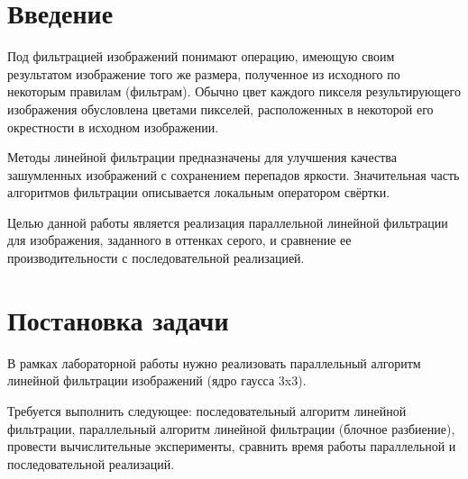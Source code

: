 \documentclass{report}
\begin{document}
\setcounter{page}{2}

\newpage

\section*{Введение}
Под фильтрацией изображений понимают операцию, имеющую своим результатом изображение того же размера, полученное из исходного по некоторым правилам (фильтрам). Обычно цвет каждого пикселя результирующего изображения обусловлена цветами пикселей, расположенных в некоторой его окрестности в исходном изображении.
\par
Методы линейной фильтрации предназначены для улучшения качества зашумленных изображений с сохранением перепадов яркости. Значительная часть алгоритмов фильтрации описывается локальным оператором свёртки.
\par
Целью данной работы является реализация параллельной линейной фильтрации для изображения, заданного в оттенках серого, и сравнение ее производительности с последовательной реализацией.
\newpage

\section*{Постановка задачи}
В рамках лабораторной работы нужно реализовать параллельный алгоритм линейной фильтрации изображений (ядро гаусса 3x3).
\par
Требуется выполнить следующее: последовательный алгоритм линейной фильтрации, параллельный алгоритм линейной фильтрации (блочное разбиение), провести вычислительные эксперименты, сравнить время работы параллельной и последовательной реализаций.
\newpage

\end{document}
